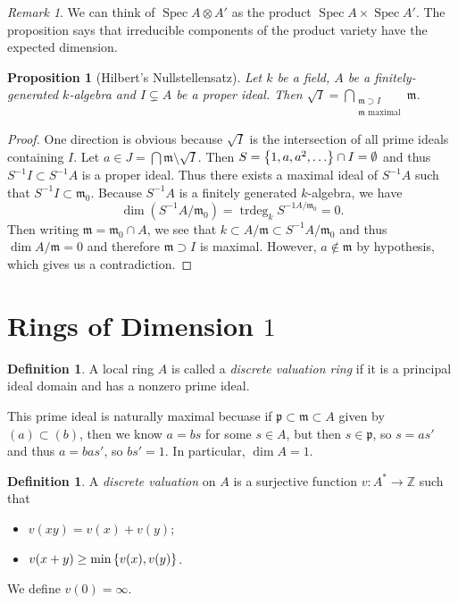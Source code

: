 \documentclass[leqno, openany]{memoir}
\newtheorem{prop}[thm]{Proposition}
\theoremstyle{definition}
\newtheorem{defn}[thm]{Definition}
\theoremstyle{remark}
\newtheorem{rmk}[thm]{Remark}
\theoremstyle{plain}
\theoremstyle{definition}
\theoremstyle{remark}
\newcommand{\Z}{\mathbb{Z}}
\newcommand{\mf}[1]{\mathfrak{#1}}
\DeclareMathOperator{\Spec}{Spec}
\begin{document}
\begin{rmk}
    We can think of $\Spec A \otimes A'$ as the product $\Spec A \times \Spec A'$. The proposition says that irreducible components of the product variety have the expected dimension.
\end{rmk}

\begin{prop}[Hilbert's Nullstellensatz]
    Let $k$ be a field, $A$ be a finitely-generated $k$-algebra and $I \subsetneq A$ be a proper ideal. Then $\sqrt{I} = \bigcap_{\substack{\mf{m} \supset I \\ \mf{m} \text{ maximal}}} \mf{m}$.
\end{prop}

\begin{proof}
    One direction is obvious because $\sqrt{I}$ is the intersection of all prime ideals containing $I$. Let $a \in J = \bigcap \mf{m} \setminus \sqrt{I}$. Then $S = \qty{1, a, a^2, \ldots } \cap I = \emptyset$ and thus $S^{-1}I \subset S^{-1}A$ is a proper ideal. Thus there exists a maximal ideal of $S^{-1}A$ such that $S^{-1}I \subset \mf{m}_0$. Because $S^{-1}A$ is a finitely generated $k$-algebra, we have
    \[ \dim (S^{-1}A / \mf{m}_0) = \operatorname{trdeg}_k S^{-1A / \mf{m_0}} = 0. \]
    Then writing $\mf{m} = \mf{m}_0 \cap A$, we see that $k \subset A/\mf{m} \subset S^{-1} A / \mf{m}_0$ and thus $\dim A / \mf{m} = 0$ and therefore $\mf{m} \supset I$ is maximal. However, $a \notin \mf{m}$ by hypothesis, which gives us a contradiction.
\end{proof}

\section{Rings of Dimension $1$}%
\label{sec:rings_of_dimension_1_}

\begin{defn}
    A local ring $A$ is called a \textit{discrete valuation ring} if it is a principal ideal domain and has a nonzero prime ideal.
\end{defn}

This prime ideal is naturally maximal becuase if $\mf{p} \subset \mf{m} \subset A$ given by $(a) \subset (b)$, then we know $a = bs$ for some $s \in A$, but then $s \in \mf{p}$, so $s = as'$ and thus $a = bas'$, so $bs' = 1$. In particular, $\dim A = 1$.

\begin{defn}
    A \textit{discrete valuation} on $A$ is a surjective function $v \colon A^* \to \Z$ such that
    \begin{itemize}
        \item $v(xy) = v(x) + v(y)$;
        \item $v(x+y) \geq \min \qty{v(x), v(y)}$.
    \end{itemize}
    We define $v(0) = \infty$.
\end{defn}
\end{document}
